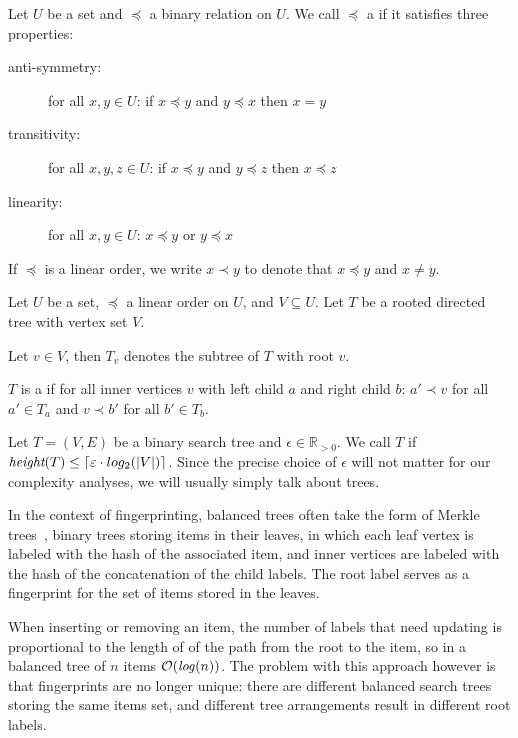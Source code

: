 \begin{definition}
Let $U$ be a set and $\preceq$ a binary relation on $U$.
We call $\preceq$ a  if it satisfies three properties:

  \begin{description}
    \item[anti-symmetry:] for all $x, y \in U$: if $x \preceq y$ and $y \preceq x$ then $x = y$
    \item[transitivity:] for all $x, y, z \in U$: if $x \preceq y$ and $y \preceq z$ then $x \preceq z$
    \item[linearity:] for all $x, y \in U$: $x \preceq y$ or $y \preceq x$
  \end{description}

If $\preceq$ is a linear order, we write $x \prec y$ to denote that $x \preceq y$ and $x \neq y$.
\end{definition}

\begin{definition}
Let $U$ be a set, $\preceq$ a linear order on $U$, and $V \subseteq U$. Let $T$ be a rooted directed tree with vertex set $V$.

Let $v \in V$, then $T_v$ denotes the subtree of $T$ with root $v$.

$T$ is a  if for all inner vertices $v$ with left child $a$ and right child $b$: $a' \prec v$ for all $a' \in T_a$ and $v \prec b'$ for all $b' \in T_b$.


\end{definition}

\begin{definition}
Let $T = (V, E)$ be a binary search tree and $\epsilon \in \mathbb{R}_{> 0}$.
We call $T$  if $\textit{height}(T) \leq \ceil*{\epsilon \cdot log_2(|V|)}$.
Since the precise choice of $\epsilon$ will not matter for our complexity analyses, we will usually simply talk about  trees.
\end{definition}

In the context of fingerprinting, balanced trees often take the form of Merkle trees~\cite{merkle1989certified}, binary trees storing items in their leaves, in which each leaf vertex is labeled with the hash of the associated item, and inner vertices are labeled with the hash of the concatenation of the child labels. The root label serves as a fingerprint for the set of items stored in the leaves.

When inserting or removing an item, the number of labels that need updating is proportional to the length of of the path from the root to the item, so in a balanced tree of $n$ items $\complexity{\mathit{log}(n)}$. The problem with this approach however is that fingerprints are no longer unique: there are different balanced search trees storing the same items set, and different tree arrangements result in different root labels.

